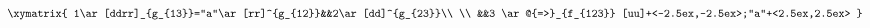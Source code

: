 \begin{equation}
\label{eq_labeled}
\begin{aligned}
\xymatrix{
  1\ar[ddrr]_{g_{13}}="a"\ar[rr]^{g_{12}}&&2\ar[dd]^{g_{23}}\\
  \\
  &&3
  \ar@{=>}_{f_{123}} [uu]+<-2.5ex,-2.5ex>;"a"+<2.5ex,2.5ex>
}
\end{aligned}
\end{equation}

